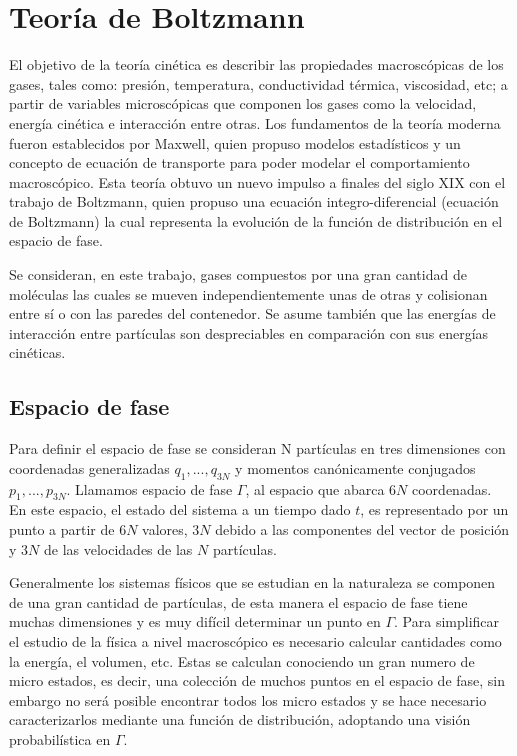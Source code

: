 \chapter{Teoría de Boltzmann}


El objetivo de la teoría cinética es describir las propiedades macroscópicas de los gases, tales como: presión, temperatura, conductividad térmica, viscosidad, etc; a partir de variables microscópicas que componen los gases como la velocidad, energía cinética e interacción entre otras. Los fundamentos de la teoría moderna fueron establecidos por Maxwell, quien propuso modelos estadísticos y un concepto de ecuación de transporte para poder modelar el comportamiento macroscópico. Esta teoría obtuvo un nuevo impulso a finales del siglo XIX con el trabajo de Boltzmann, quien propuso una ecuación integro-diferencial (ecuación de Boltzmann) la cual representa la evolución de la función de distribución en el espacio de fase. 

\medskip

\noindent Se consideran, en este trabajo, gases compuestos por una gran cantidad de moléculas las cuales se mueven independientemente unas de otras y colisionan entre sí o con las paredes del contenedor. Se asume también que las energías de interacción entre partículas son despreciables en comparación con sus energías cinéticas.

\section{Espacio de fase}

Para definir el espacio de fase se consideran N partículas en tres dimensiones con coordenadas generalizadas $q_{1}, ..., q_{3N}$ y momentos canónicamente conjugados  $p_{1}, ... , p_{3N}$. Llamamos espacio de fase $\Gamma$, al espacio que abarca $6N$ coordenadas. En este espacio, el estado del sistema a un tiempo dado $t$, es representado por un punto a partir de $6N$ valores, $3N$ debido a las componentes del vector de posición y $3N$ de las velocidades de las $N$ partículas.

\medskip

\noindent Generalmente los sistemas físicos que se estudian en la naturaleza se componen de una gran cantidad de partículas, de esta manera el espacio de fase tiene muchas dimensiones y es muy difícil determinar un punto en $\Gamma$. Para simplificar el estudio de la física a nivel macroscópico es necesario calcular cantidades como la energía, el volumen, etc. Estas se calculan conociendo un gran numero de micro estados, es decir, una colección de muchos puntos en el espacio de fase, sin embargo no será posible encontrar todos los micro estados y se hace necesario caracterizarlos mediante una función de distribución, adoptando una visión probabilística en $\Gamma$. 

